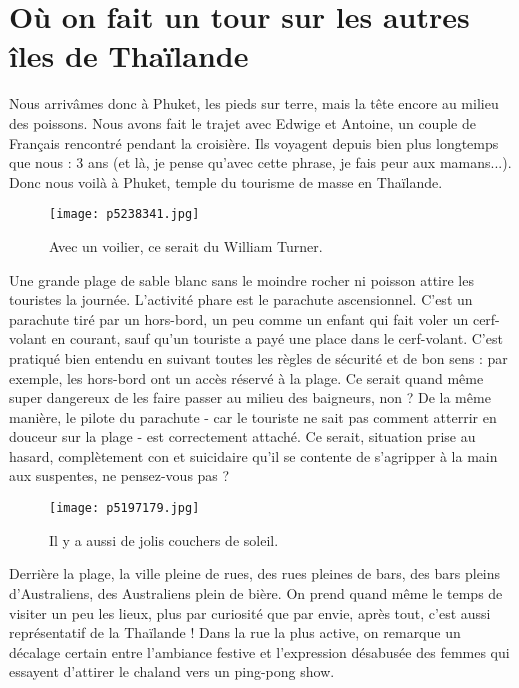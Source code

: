 \documentclass{book}
\begin{document}
\chapter{Où on fait un tour sur les autres îles de Thaïlande}
Nous arrivâmes donc à Phuket, les pieds sur terre, mais la tête encore au milieu des poissons. Nous avons fait le trajet avec Edwige et Antoine, un couple de Français rencontré pendant la croisière. Ils voyagent depuis bien plus longtemps que nous : 3 ans (et là, je pense qu'avec cette phrase, je fais peur aux mamans...). Donc nous voilà à Phuket, temple du tourisme de masse en Thaïlande.


\begin{figure}[h]
\centering
\texttt{[image: p5238341.jpg]}
\caption*{Avec un voilier, ce serait du William Turner.}
\end{figure}

Une grande plage de sable blanc sans le moindre rocher ni poisson attire les touristes la journée. L'activité phare est le parachute ascensionnel. C'est un parachute tiré par un hors-bord, un peu comme un enfant qui fait voler un cerf-volant en courant, sauf qu'un touriste a payé une place dans le cerf-volant. C'est pratiqué bien entendu en suivant toutes les règles de sécurité et de bon sens : par exemple, les hors-bord ont un accès réservé à la plage. Ce serait quand même super dangereux de les faire passer au milieu des baigneurs, non ? De la même manière, le pilote du parachute - car le touriste ne sait pas comment atterrir en douceur sur la plage - est correctement attaché. Ce serait, situation prise au hasard, complètement con et suicidaire qu'il se contente de s'agripper à la main aux suspentes, ne pensez-vous pas ?


\begin{figure}[h]
\centering
\texttt{[image: p5197179.jpg]}
\caption*{Il y a aussi de jolis couchers de soleil.}
\end{figure}

Derrière la plage, la ville pleine de rues, des rues pleines de bars, des bars pleins d'Australiens, des Australiens plein de bière. On prend quand même le temps de visiter un peu les lieux, plus par curiosité que par envie, après tout, c'est aussi représentatif de la Thaïlande ! Dans la rue la plus active, on remarque un décalage certain entre l'ambiance festive et l'expression désabusée des femmes qui essayent d'attirer le chaland vers un ping-pong show.
\end{document}
